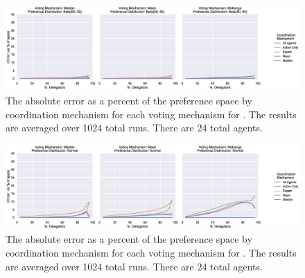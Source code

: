 \begin{landscape}
    \begin{figure}[p]
        \centering
        \includegraphics[scale=0.55]
        {content/chapter2/figures/distributions/Beta_50_50_error_as_percent_of_space_abs_mean}
        \caption{
            The absolute error as a percent of the preference space by coordination
            mechanism for each voting mechanism for .
            The results are averaged over 1024 total runs.
            There are 24 total agents.
        }
        \label{fig:beta-50-50-error-as-percent-of-space-abs-mean}
    \end{figure}
\end{landscape}

\begin{landscape}
    \begin{figure}[p]
        \centering
        \includegraphics[scale=0.55]
        {content/chapter2/figures/distributions/Normal_error_as_percent_of_space_abs_mean}
        \caption{
            The absolute error as a percent of the preference space by coordination
            mechanism for each voting mechanism for \gaussiandist.
            The results are averaged over 1024 total runs.
            There are 24 total agents.
        }
        \label{fig:normal-error-as-percent-of-space-abs-mean}
    \end{figure}
\end{landscape}

